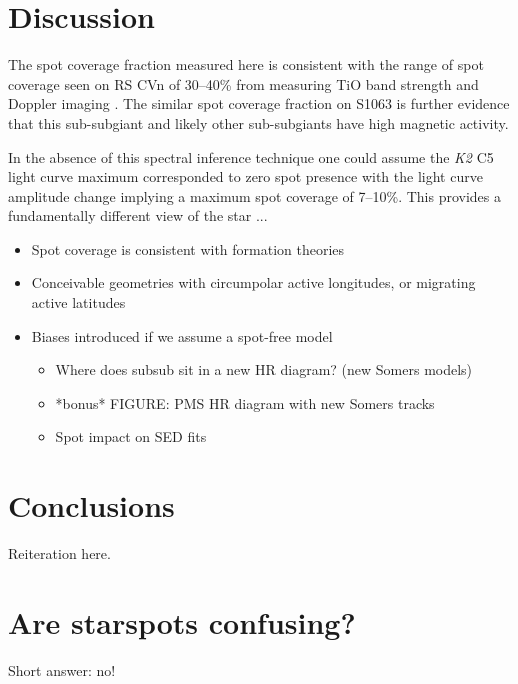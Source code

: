 \documentclass[twocolumn]{emulateapj}%
\begin{document}
\section{Discussion}


The spot coverage fraction measured here is consistent with the range of spot coverage seen on RS CVn of 30--40\% from measuring TiO band strength \citep{oneal96, oneal98, oneal04} and Doppler imaging \citep{hackman12}. The similar spot coverage fraction on S1063 is further evidence that this sub-subgiant and likely other sub-subgiants have high magnetic activity.

In the absence of this spectral inference technique one could assume the \textit{K2} C5 light curve maximum corresponded to zero spot presence with the light curve amplitude change implying a maximum spot coverage of 7--10\%. This provides a fundamentally different view of the star ...

\begin{itemize}
\item Spot coverage is consistent with formation theories
\item Conceivable geometries with circumpolar active longitudes, or migrating active latitudes
\item Biases introduced if we assume a spot-free model
\begin{itemize}
  \item Where does subsub sit in a new HR diagram? (new Somers models)
  \item *bonus* FIGURE: PMS HR diagram with new Somers tracks
  \item Spot impact on SED fits
\end{itemize}
\end{itemize}

\section{Conclusions}

Reiteration here.

\clearpage
\pagebreak


\appendix

\section{Are starspots confusing?}
\label{methods-details}

Short answer: no!

\acknowledgements
\end{document}
